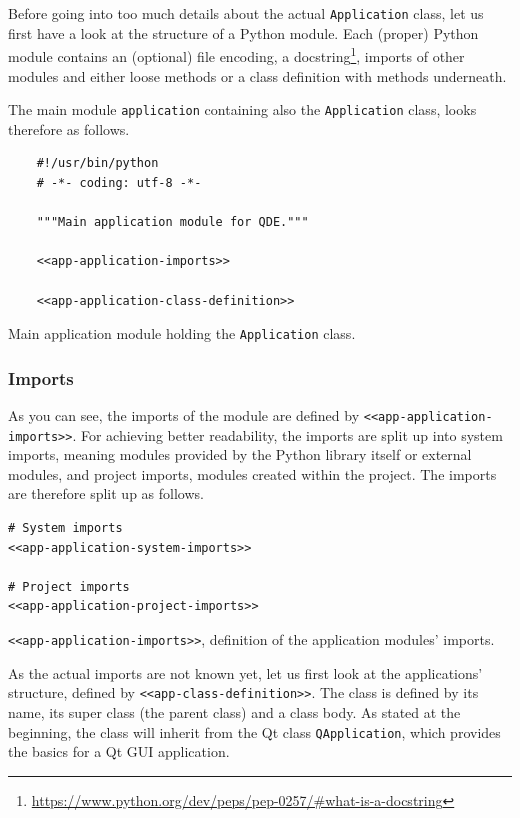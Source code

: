 \documentclass[10pt, openright, notitlepage]{scrreprt}
\begin{document}
Before going into too much details about the actual \texttt{Application} class, let us
first have a look at the structure of a Python module. Each (proper) Python
module contains an (optional) file encoding, a
docstring\footnote{\url{https://www.python.org/dev/peps/pep-0257/\#what-is-a-docstring}},
imports of other modules and either loose methods or a class definition with
methods underneath.

The main module \texttt{application} containing also the \texttt{Application} class, looks
therefore as follows.

\begin{listing}[H]
\begin{verbatim}
    #!/usr/bin/python
    # -*- coding: utf-8 -*-
    
    """Main application module for QDE."""
    
    <<app-application-imports>>
    
    <<app-application-class-definition>>
\end{verbatim}
\caption{Main application module holding the \texttt{Application} class.}
\end{listing}

\subsubsection{Imports}
\label{sec:orgaeb9846}
As you can see, the imports of the module are defined by \texttt{<<app-application-imports>>}. For
achieving better readability, the imports are split up into system imports,
meaning modules provided by the Python library itself or external modules, and
project imports, modules created within the project. The imports are therefore
split up as follows.

\begin{listing}[H]
\begin{verbatim}
# System imports
<<app-application-system-imports>>

# Project imports
<<app-application-project-imports>>
\end{verbatim}
\caption{\label{app-application-imports}
\texttt{<<app-application-imports>>}, definition of the application modules' imports.}
\end{listing}

As the actual imports are not known yet, let us first look at the applications'
structure, defined by \texttt{<<app-class-definition>>}. The class is defined by its
name, its super class (the parent class) and a class body. As stated at the
beginning, the class will inherit from the Qt class \texttt{QApplication}, which
provides the basics for a Qt GUI application.
\end{document}
